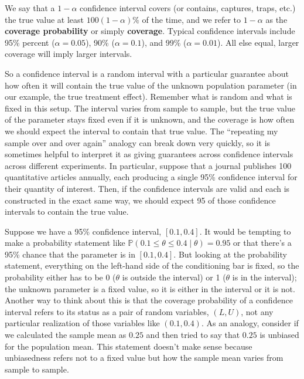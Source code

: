 \documentclass[
  13pt,
  letterpaper,
  DIV=11,
  numbers=noendperiod]{scrreprt}
\renewcommand{\P}{\mathbb{P}}
\theoremstyle{plain}
\theoremstyle{definition}
\theoremstyle{definition}
\theoremstyle{remark}
\begin{document}
We say that a \(1-\alpha\) confidence interval covers (or contains,
captures, traps, etc.) the true value at least \(100(1-\alpha)\%\) of
the time, and we refer to \(1-\alpha\) as the \textbf{coverage
probability} or simply \textbf{coverage}. Typical confidence intervals
include 95\% percent (\(\alpha = 0.05\)), 90\% (\(\alpha = 0.1\)), and
99\% (\(\alpha = 0.01\)). All else equal, larger coverage will imply
larger intervals.

So a confidence interval is a random interval with a particular
guarantee about how often it will contain the true value of the unknown
population parameter (in our example, the true treatment effect).
Remember what is random and what is fixed in this setup. The interval
varies from sample to sample, but the true value of the parameter stays
fixed even if it is unknown, and the coverage is how often we should
expect the interval to contain that true value. The ``repeating my
sample over and over again'' analogy can break down very quickly, so it
is sometimes helpful to interpret it as giving guarantees across
confidence intervals across different experiments. In particular,
suppose that a journal publishes 100 quantitative articles annually,
each producing a single 95\% confidence interval for their quantity of
interest. Then, if the confidence intervals are valid and each is
constructed in the exact same way, we should expect 95 of those
confidence intervals to contain the true value.

\begin{tcolorbox}[enhanced jigsaw, title=\textcolor{quarto-callout-warning-color}{\faExclamationTriangle}\hspace{0.5em}{Warning}, breakable, colbacktitle=quarto-callout-warning-color!10!white, toptitle=1mm, colback=white, arc=.35mm, left=2mm, opacityback=0, titlerule=0mm, colframe=quarto-callout-warning-color-frame, leftrule=.75mm, coltitle=black, opacitybacktitle=0.6, bottomtitle=1mm, rightrule=.15mm, bottomrule=.15mm, toprule=.15mm]

Suppose we have a 95\% confidence interval, \([0.1, 0.4]\). It would be
tempting to make a probability statement like
\(\P(0.1 \leq \theta \leq 0.4 \mid \theta) = 0.95\) or that there's a
95\% chance that the parameter is in \([0.1, 0.4]\). But looking at the
probability statement, everything on the left-hand side of the
conditioning bar is fixed, so the probability either has to be 0
(\(\theta\) is outside the interval) or 1 (\(\theta\) is in the
interval); the unknown parameter is a fixed value, so it is either in
the interval or it is not. Another way to think about this is that the
coverage probability of a confidence interval refers to its status as a
pair of random variables, \((L, U)\), not any particular realization of
those variables like \((0.1, 0.4)\). As an analogy, consider if we
calculated the sample mean as \(0.25\) and then tried to say that
\(0.25\) is unbiased for the population mean. This statement doesn't
make sense because unbiasedness refers not to a fixed value but how the
sample mean varies from sample to sample.

\end{tcolorbox}
\end{document}
